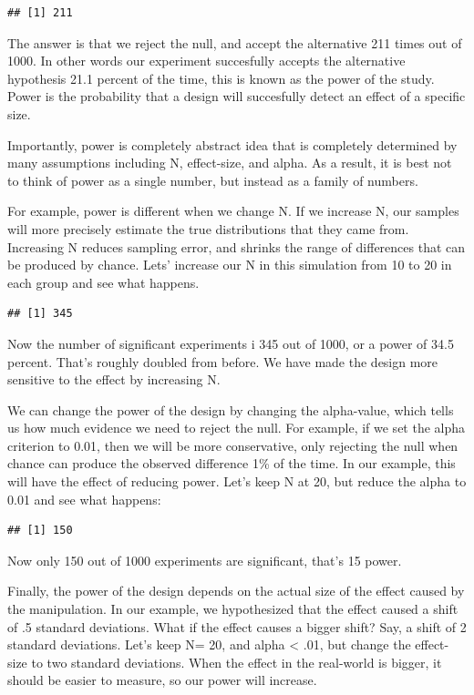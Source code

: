 \documentclass[
]{book}
\begin{document}
\begin{verbatim}
## [1] 211
\end{verbatim}

The answer is that we reject the null, and accept the alternative 211 times out of 1000. In other words our experiment succesfully accepts the alternative hypothesis 21.1 percent of the time, this is known as the power of the study. Power is the probability that a design will succesfully detect an effect of a specific size.

Importantly, power is completely abstract idea that is completely determined by many assumptions including N, effect-size, and alpha. As a result, it is best not to think of power as a single number, but instead as a family of numbers.

For example, power is different when we change N. If we increase N, our samples will more precisely estimate the true distributions that they came from. Increasing N reduces sampling error, and shrinks the range of differences that can be produced by chance. Lets' increase our N in this simulation from 10 to 20 in each group and see what happens.

\begin{verbatim}
## [1] 345
\end{verbatim}

Now the number of significant experiments i 345 out of 1000, or a power of 34.5 percent. That's roughly doubled from before. We have made the design more sensitive to the effect by increasing N.

We can change the power of the design by changing the alpha-value, which tells us how much evidence we need to reject the null. For example, if we set the alpha criterion to 0.01, then we will be more conservative, only rejecting the null when chance can produce the observed difference 1\% of the time. In our example, this will have the effect of reducing power. Let's keep N at 20, but reduce the alpha to 0.01 and see what happens:

\begin{verbatim}
## [1] 150
\end{verbatim}

Now only 150 out of 1000 experiments are significant, that's 15 power.

Finally, the power of the design depends on the actual size of the effect caused by the manipulation. In our example, we hypothesized that the effect caused a shift of .5 standard deviations. What if the effect causes a bigger shift? Say, a shift of 2 standard deviations. Let's keep N= 20, and alpha \textless{} .01, but change the effect-size to two standard deviations. When the effect in the real-world is bigger, it should be easier to measure, so our power will increase.
\end{document}
